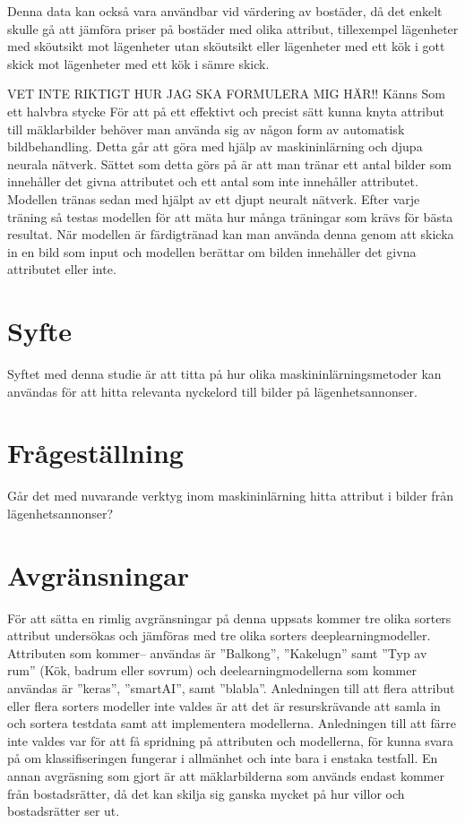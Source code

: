 \documentclass[]{kththesis}
\begin{document}
Denna data kan också vara användbar vid värdering av bostäder, då det enkelt skulle gå att jämföra priser på bostäder med olika attribut, tillexempel lägenheter med sköutsikt mot lägenheter utan sköutsikt eller lägenheter med ett kök i gott skick mot lägenheter med ett kök i sämre skick.

VET INTE RIKTIGT HUR JAG SKA FORMULERA MIG HÄR!! Känns Som ett halvbra stycke
För att på ett effektivt och precist sätt kunna knyta attribut till mäklarbilder behöver man använda sig av någon form av automatisk bildbehandling.
Detta går att göra med hjälp av maskininlärning och djupa neurala nätverk.
Sättet som detta görs på är att man tränar ett antal bilder som innehåller det givna attributet och ett antal som inte innehåller attributet.
Modellen tränas sedan med hjälpt av ett djupt neuralt nätverk. 
Efter varje träning så testas modellen för att mäta hur många träningar som krävs för bästa resultat.
När modellen är färdigtränad kan man använda denna genom att skicka in en bild som input och modellen berättar om bilden innehåller det givna attributet eller inte.

\section{Syfte}
Syftet med denna studie är att titta på hur olika maskininlärningsmetoder kan användas för att hitta relevanta nyckelord till bilder på lägenhetsannonser. 

\section{Frågeställning}
Går det med nuvarande verktyg inom maskininlärning hitta attribut i bilder från lägenhetsannonser?

\section{Avgränsningar}
För att sätta en rimlig avgränsningar på denna uppsats kommer tre olika sorters attribut undersökas och jämföras med tre olika sorters deeplearningmodeller. 
Attributen som kommer– användas är ”Balkong”, ”Kakelugn” samt ”Typ av rum” (Kök, badrum eller sovrum) och deelearningmodellerna som kommer användas är ”keras”, ”smartAI”, samt ”blabla”. 
Anledningen till att flera attribut eller flera sorters modeller inte valdes är att det är resurskrävande att samla in och sortera testdata samt att implementera modellerna. 
Anledningen till att färre inte valdes var för att få spridning på attributen och modellerna, för kunna svara på om klassifiseringen fungerar i allmänhet och inte bara i enstaka testfall. 
En annan avgräsning som gjort är att mäklarbilderna som används endast kommer från bostadsrätter, då det kan skilja sig ganska mycket på hur villor och bostadsrätter ser ut.
\end{document}
